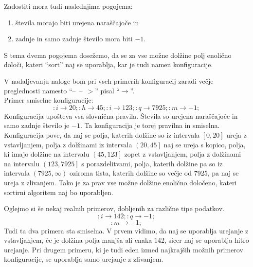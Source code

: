 \documentclass[a4paper,oneside,12pt]{article}
\newcommand{\konfarrow}{\mbox{--}~\mbox{--}~\mbox{\ensuremath{>}}}
\newcommand{\lra}{\ensuremath{\longrightarrow}}
\begin{document}
Zadostiti mora tudi naslednjima pogojema:
\begin{enumerate}
  \item števila morajo biti urejena naraščajoče in
  \item zadnje in samo zadnje število mora biti $-1$.
\end{enumerate}
S tema dvema pogojema dosežemo, da se za vse možne dolžine polj enolično
določi, kateri ``sort'' naj se uporablja, kar je tudi namen konfiguracije.

V nadaljevanju naloge bom pri vseh primerih konfiguracij zaradi večje preglednosti 
namesto ``\konfarrow'' pisal ``\lra''. \\

Primer smiselne konfiguracije:
\[ :i \lra 20;:h \lra 45;:i \lra 123;:q \lra 7925;:m \lra -1; \]
Konfiguracija upošteva vsa slovnična pravila.
Števila so urejena naraščajoče in samo zadnje število je $-1$. Ta konfiguracija je torej
pravilna in smiselna. Konfiguracija pove, da naj se polja, katerih dolžine so iz intervala $\left[0,
20\right]$ ureja z vstavljanjem, polja z dolžinami iz intervala $\left(20, 45\right]$ naj
se ureja s kopico, polja, ki imajo dolžine na intervalu $\left(45, 123\right]$ zopet z vstavljanjem,
polja z dolžinami na intervalu $\left(123, 7925\right]$ s porazdelitvami, polja, katerih dolžine pa so iz
intervala $\left(7925, \infty\right)$ oziroma tista, katerih dolžine so večje od 7925,
pa naj se ureja z zlivanjem. Tako je za prav vse možne dolžine enolično določeno, kateri
sortirni algoritem naj bo uporabljen.

Oglejmo si še nekaj realnih primerov, dobljenih za različne tipe podatkov.
\[ :i \lra 142;:q \lra -1;\]
\[ :m \lra -1; \]
Tudi ta dva primera sta smiselna. V prvem vidimo, da naj se uporablja urejanje z
vstavljanjem, če je dolžina polja manjša ali enaka 142, sicer naj se uporablja hitro
urejanje. Pri drugem primeru, ki je tudi eden izmed najkrajših možnih primerov
konfiguracije, se uporablja samo urejanje z zlivanjem.\\

\end{document}
